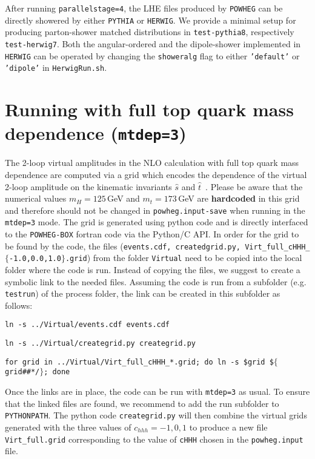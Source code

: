 \documentclass[paper]{JHEP3}
\newcommand\POWHEG{{\tt POWHEG}}
\newcommand\POWHEGBOX{{\tt POWHEG-BOX}}
\newcommand\HERWIG{{\tt HERWIG}}
\newcommand\PYTHIA{{\tt PYTHIA}}
\begin{document}
After running {\tt parallelstage=4}, the LHE files produced by \POWHEG{} can be directly showered by either \PYTHIA{} or \HERWIG{}. We provide a minimal setup for producing parton-shower matched distributions in {\tt test-pythia8}, respectively {\tt test-herwig7}. Both the angular-ordered and the dipole-shower implemented in \HERWIG{} can be operated by changing the {\tt showeralg} flag to either {\tt 'default'} or {\tt 'dipole'} in {\tt HerwigRun.sh}.

\section{Running with full top quark mass dependence ({\tt mtdep=3})}
The 2-loop virtual amplitudes in the NLO calculation with full top quark mass dependence are computed via a grid
which encodes the dependence of the virtual 2-loop amplitude on the
kinematic invariants $\hat{s}$ and
$\hat{t}$~\cite{Heinrich:2017kxx}. Please be aware that the numerical
values $m_H=125$\,GeV and $m_t=173$\,GeV are {\bf hardcoded} in this
grid and therefore should not be changed in {\tt powheg.input-save} when running in the {\tt mtdep=3} mode.
The grid is generated using python code and is directly interfaced to the
\POWHEGBOX{} fortran code via the Python/C API. In order for the grid to be found by the code, the
files ({\tt events.cdf, createdgrid.py, Virt\_full\_cHHH\_$\lbrace$-1.0,0.0,1.0$\rbrace$.grid}) from the
folder {\tt Virtual} need to be copied into the local folder where the
code is run. Instead of copying the files, we suggest to create a
symbolic link to the needed files. Assuming the code is run from a
subfolder (e.g. {\tt testrun}) of the process folder, the link can be created in this subfolder as follows:
\begin{description}
\item{\tt ln -s ../Virtual/events.cdf events.cdf}
\item{\tt ln -s ../Virtual/creategrid.py creategrid.py}
\item{\tt for grid in ../Virtual/Virt\_full\_cHHH\_*.grid; do ln -s \$grid \$$\lbrace$grid\#\#*/$\rbrace$; done}
\end{description}
Once the links are in place, the code can be run with {\tt mtdep=3} as
usual. To ensure that the linked files are found, we recommend to add the run subfolder to {\tt PYTHONPATH}. 
The python code {\tt creategrid.py} will then combine the virtual grids generated with the three values of $c_{hhh} = -1,0,1$ 
to produce a new file {\tt Virt\_full.grid} corresponding to the value of {\tt cHHH} chosen in the {\tt powheg.input} file.
\end{document}
